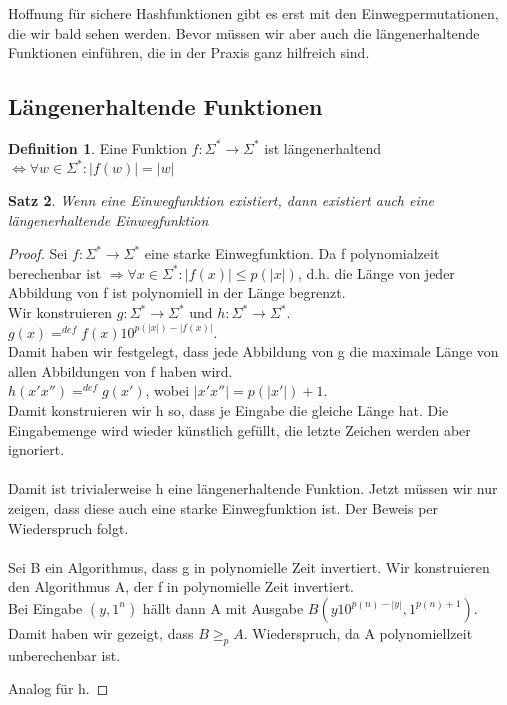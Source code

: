 \documentclass[12pt,a4paper]{article}
\newtheorem{theorem}{Satz}[section]
\theoremstyle{definition}
\newtheorem{definition}[theorem]{Definition}
\begin{document}
    Hoffnung für sichere Hashfunktionen gibt es erst mit den Einwegpermutationen, die wir bald sehen werden. Bevor
    müssen wir aber auch die längenerhaltende Funktionen einführen, die in der Praxis ganz hilfreich sind.


    \subsection{Längenerhaltende Funktionen}

    \begin{definition}
        Eine Funktion $f: \Sigma^* \longrightarrow \Sigma^*$ ist
        längenerhaltend $\Leftrightarrow \forall w \in \Sigma^{*}: |f(w)| = |w|$
    \end{definition}
    \begin{theorem}
        Wenn eine Einwegfunktion existiert, dann existiert auch eine längenerhaltende Einwegfunktion
    \end{theorem}
    \begin{proof}
        Sei $f: \Sigma^* \longrightarrow \Sigma^*$ eine starke Einwegfunktion.
        Da f polynomialzeit berechenbar ist $\Rightarrow \forall x \in \Sigma^*: |f(x)| \leq p(|x|)$, d.h. die
        Länge von jeder Abbildung von f ist polynomiell in der Länge begrenzt. \\
        Wir konstruieren $g: \Sigma^* \longrightarrow \Sigma^*$ und $h: \Sigma^* \longrightarrow \Sigma^*$. \\
        $g(x) =^{def} f(x)10^{p(|x|) - |f(x)|}$. \\
        Damit haben wir festgelegt, dass jede Abbildung von g die maximale
        Länge von allen Abbildungen von f haben wird. \\
        $h(x'x'') =^{def} g(x')$, wobei $|x'x''| = p(|x'|) + 1$. \\
        Damit konstruieren wir h so, dass je Eingabe die gleiche
        Länge hat. Die Eingabemenge wird wieder künstlich gefüllt, die letzte Zeichen werden aber ignoriert. \\ \\

        Damit ist trivialerweise h eine längenerhaltende Funktion. Jetzt müssen wir nur zeigen, dass diese auch
        eine starke Einwegfunktion ist. Der Beweis per Wiederspruch folgt.\\ \\
        Sei B ein Algorithmus, dass g in polynomielle Zeit invertiert. Wir konstruieren den Algorithmus A, der f in
        polynomielle Zeit invertiert. \\
        Bei Eingabe $(y, 1^n)$ hällt dann A mit Ausgabe $B(y10^{p(n) - |y|}, 1^{p(n) + 1})$. \\
        Damit haben wir gezeigt, dass $B \geq_p A$. Wiederspruch, da A polynomiellzeit unberechenbar ist.

        Analog für h.
    \end{proof}
\end{document}
